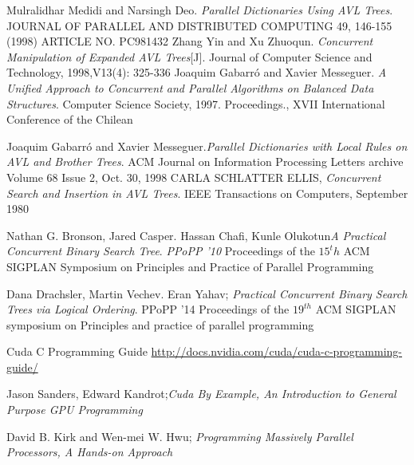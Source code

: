 \documentclass[MTech]{iitmdiss}
\begin{document}
\begin{thebibliography}{1}

Mulralidhar Medidi and Narsingh Deo. \emph{Parallel Dictionaries Using AVL Trees}. JOURNAL OF PARALLEL AND DISTRIBUTED COMPUTING 49, 146-155 (1998) ARTICLE NO. PC981432
Zhang Yin and Xu Zhuoqun. \emph{Concurrent Manipulation of Expanded AVL Trees}[J].  Journal of Computer Science and Technology, 1998,V13(4): 325-336
Joaquim Gabarr\'o and Xavier Messeguer. \emph{A Unified Approach to Concurrent and Parallel Algorithms on Balanced Data Structures}.  Computer Science Society, 1997. Proceedings., XVII International Conference of the Chilean

Joaquim Gabarr\'o and Xavier Messeguer.\textit{Parallel Dictionaries with Local Rules on AVL and Brother Trees}. ACM Journal on Information Processing Letters archive Volume 68 Issue 2, Oct. 30, 1998 
CARLA SCHLATTER ELLIS, \emph{Concurrent Search and Insertion in AVL Trees}. IEEE Transactions on Computers, September 1980  

Nathan G. Bronson, Jared Casper. Hassan Chafi, Kunle Olukotun\textit{A Practical Concurrent Binary Search Tree}. \textit{PPoPP '10} Proceedings of the $15^th$ ACM SIGPLAN Symposium on Principles and Practice of Parallel Programming

Dana Drachsler, Martin Vechev. Eran Yahav; \textit{Practical Concurrent Binary Search Trees via Logical Ordering}. PPoPP '14 Proceedings of the $19^{th}$ ACM SIGPLAN symposium on Principles and practice of parallel programming 

Cuda C Programming Guide \url{http://docs.nvidia.com/cuda/cuda-c-programming-guide/}

Jason Sanders, Edward Kandrot;\textit{Cuda By Example, An Introduction to General Purpose GPU Programming}

David B. Kirk and Wen-mei W. Hwu; \textit{Programming Massively Parallel Processors, A Hands-on Approach}

\end{thebibliography} 
\end{document}
